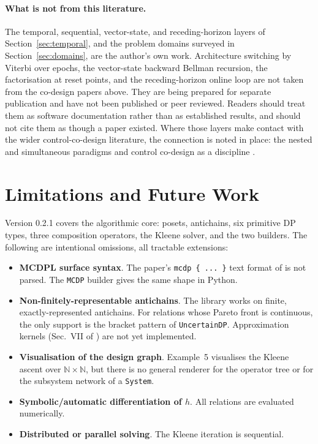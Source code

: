 \documentclass[11pt,a4paper]{article}
\newcommand{\Nat}{\mathbb{N}}
\begin{document}
\paragraph{What is not from this literature.} The temporal, sequential,
vector-state, and receding-horizon layers of
Section~\ref{sec:temporal}, and the problem domains surveyed in
Section~\ref{sec:domains}, are the author's own work. Architecture
switching by Viterbi over epochs, the vector-state backward Bellman
recursion, the factorisation at reset points, and the receding-horizon
online loop are not taken from the co-design papers above. They are being
prepared for separate publication and have not been published or peer
reviewed. Readers should treat them as software documentation rather than
as established results, and should not cite them as though a paper
existed. Where those layers make contact with the wider control-co-design
literature, the connection is noted in place: the nested and simultaneous
paradigms \citep{herber2018nested} and control co-design as a discipline
\citep{garciasanz2019ccd}.

\section{Limitations and Future Work}
\label{sec:limitations}

Version 0.2.1 covers the algorithmic core: posets, antichains, six
primitive DP types, three composition operators, the Kleene solver,
and the two builders. The following are intentional omissions, all
tractable extensions:

\begin{itemize}[leftmargin=2em]
  \item \textbf{MCDPL surface syntax}. The paper's
        \texttt{mcdp \{ ... \}} text format of \citet{mcdpl} is not
        parsed. The
        \texttt{MCDP} builder gives the same shape in Python.
  \item \textbf{Non-finitely-representable antichains}. The library
        works on finite, exactly-represented antichains. For
        relations whose Pareto front is continuous, the only support
        is the bracket pattern of \texttt{UncertainDP}. Approximation
        kernels (Sec.~VII of \citealp{censi2015mathematical}) are not yet
        implemented.
  \item \textbf{Visualisation of the design graph}. Example~5
        visualises the Kleene ascent over $\Nat \times \Nat$, but
        there is no general renderer for the operator tree or for
        the subsystem network of a \texttt{System}.
  \item \textbf{Symbolic/automatic differentiation of $h$}. All
        relations are evaluated numerically.
  \item \textbf{Distributed or parallel solving}. The Kleene
        iteration is sequential.
\end{itemize}
\end{document}
